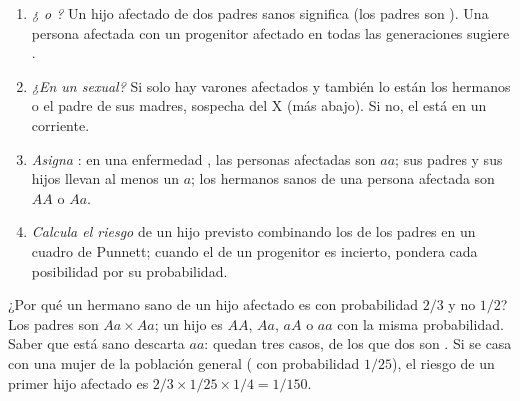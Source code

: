 \begin{method}\label{met:g11:genes-and-disease:analyse}
\begin{enumerate}
  \item \emph{¿ o ?} Un hijo afectado de dos padres
        sanos significa  (los padres son ). Una
        persona afectada con un progenitor afectado en todas las
        generaciones sugiere .
  \item \emph{¿En un  sexual?} Si solo hay varones afectados y
        también lo están los hermanos o el padre de sus madres,
        sospecha del  X (más abajo). Si no, el  está en un
         corriente.
  \item \emph{Asigna }: en una enfermedad , las
        personas afectadas son $aa$; sus padres y sus hijos llevan al
        menos un $a$; los hermanos sanos de una persona afectada son
        $AA$ o $Aa$.
  \item \emph{Calcula el riesgo} de un hijo previsto combinando los
         de los padres en un cuadro de Punnett; cuando el
         de un progenitor es incierto, pondera cada
        posibilidad por su probabilidad.
\end{enumerate}
\end{method}

\begin{example}\label{ex:g11:genes-and-disease:twothirds}
¿Por qué un hermano sano de un hijo afectado es  con
probabilidad $2/3$ y no $1/2$? Los padres son $Aa \times Aa$; un hijo
es $AA$, $Aa$, $aA$ o $aa$ con la misma probabilidad. Saber que está
sano descarta $aa$: quedan tres casos, de los que dos son .
Si se casa con una mujer de la población general ( con
probabilidad $1/25$), el riesgo de un primer hijo afectado es
$2/3 \times 1/25 \times 1/4 = 1/150$.
\end{example}

